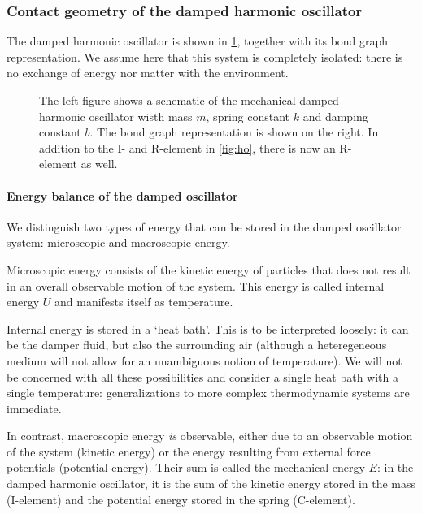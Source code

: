\subsubsection{Contact geometry of the damped harmonic oscillator}
The damped harmonic oscillator is shown in \cref{fig:dho}, together with its bond graph representation. We assume here that this system is completely isolated: there is no exchange of energy nor matter with the environment.  
\begin{figure}[ht!]
    \centering
    
    \caption{The left figure shows a schematic of the mechanical damped harmonic oscillator wisth mass \(m\), spring constant \(k\) and damping constant \(b\). The bond graph representation is shown on the right. In addition to the I- and R-element in \cref{fig:ho}, there is now an R-element as well.}
    \label{fig:dho}
\end{figure}

\paragraph{Energy balance of the damped oscillator} We distinguish two types of energy that can be stored in the damped oscillator system: microscopic and macroscopic energy.

Microscopic energy consists of the kinetic energy of particles that does not result in an overall observable motion of the system. This energy is called internal energy \(U\) and manifests itself as temperature. 

Internal energy is stored in a `heat bath'. This is to be interpreted loosely: it can be the damper fluid, but also the surrounding air (although a heteregeneous medium will not allow for an unambiguous notion of temperature). We will not be concerned with all these possibilities and consider a single heat bath with a single temperature: generalizations to more complex thermodynamic systems are immediate. 

In contrast, macroscopic energy \emph{is} observable, either due to an observable motion of the system (kinetic energy) or the energy resulting from external force potentials (potential energy). Their sum is called the mechanical energy \(E\): in the damped harmonic oscillator, it is the sum of the kinetic energy stored in the mass (I-element) and the potential energy stored in the spring (C-element).

